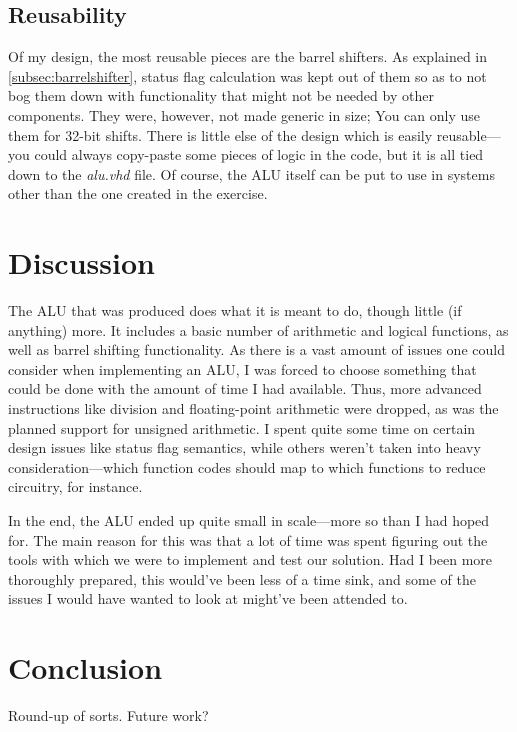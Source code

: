 \documentclass{article}
\begin{document}
\subsection{Reusability}
\label{subsec:reusability}
Of my design, the most reusable pieces are the barrel shifters. As explained in \autoref{subsec:barrelshifter}, status flag calculation was kept out of them so as to not bog them down with functionality that might not be needed by other components. They were, however, not made generic in size; You can only use them for 32-bit shifts. There is little else of the design which is easily reusable---you could always copy-paste some pieces of logic in the code, but it is all tied down to the {\em alu.vhd} file. Of course, the ALU itself can be put to use in systems other than the one created in the exercise.


\section{Discussion}
\label{sec:discussion}
The ALU that was produced does what it is meant to do, though little (if anything) more. It includes a basic number of arithmetic and logical functions, as well as barrel shifting functionality. As there is a vast amount of issues one could consider when implementing an ALU, I was forced to choose something that could be done with the amount of time I had available. Thus, more advanced instructions like division and floating-point arithmetic were dropped, as was the planned support for unsigned arithmetic. I spent quite some time on certain design issues like status flag semantics, while others weren't taken into heavy consideration---which function codes should map to which functions to reduce circuitry, for instance. 

In the end, the ALU ended up quite small in scale---more so than I had hoped for. The main reason for this was that a lot of time was spent figuring out the tools with which we were to implement and test our solution. Had I been more thoroughly prepared, this would've been less of a time sink, and some of the issues I would have wanted to look at might've been attended to.

\section{Conclusion}
\label{sec:conclusion}
Round-up of sorts. Future work?
\end{document}
